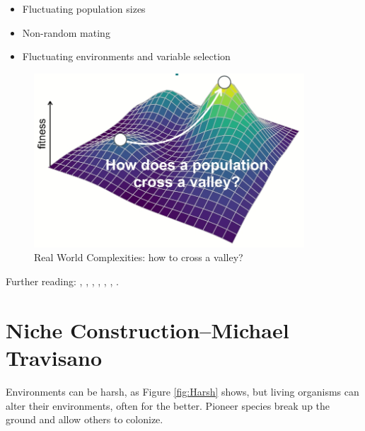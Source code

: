 \documentclass[]{article}
\begin{document}
\begin{itemize}
	\item  Fluctuating population sizes
	\item  Non-random mating
	\item  Fluctuating environments and variable
	selection
\end{itemize}
\begin{figure}[H]
	\caption{Real World Complexities: how to cross a valley?}\label{fig:RealWorldComplexities}
	\includegraphics[width=0.9\textwidth]{RealWorldComplexities}
\end{figure}

Further reading: \cite{gillespie1984molecular}, \cite{kauffman1989nk}, \cite{kimura1983neutral}, \cite{kingman2000origins}, \cite{patwa2008fixation}, \cite{poelwijk2007empirical}, \cite{rosenberg2002genealogical}.

\section[Niche Construction]{Niche Construction--Michael Travisano}


Environments can be harsh, as Figure \ref{fig:Harsh} shows, but living organisms can alter their environments, often for the better. Pioneer species break up the ground and allow others to colonize. 
\end{document}
